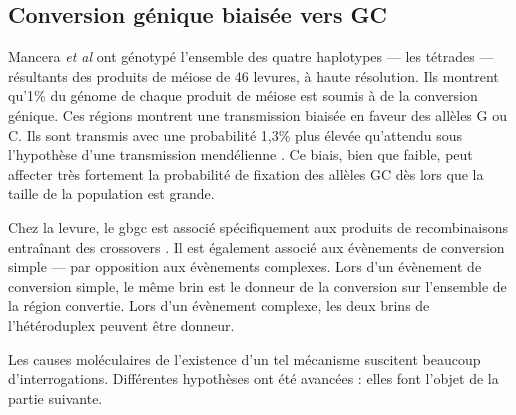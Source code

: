 \documentclass[11pt, oneside]{scrartcl}
\begin{document}
\subsection{Conversion génique biaisée vers GC}
\label{sec:orgheadline7}

Mancera \emph{et al} \cite{mancera_high-resolution_2008} ont génotypé l'ensemble des
quatre haplotypes --- les tétrades --- résultants des produits de méiose de 46
levures, à haute résolution. Ils montrent qu'1\% du génome de chaque produit de
méiose est soumis à de la conversion génique. Ces régions montrent une
transmission biaisée en faveur des allèles G ou C. Ils sont transmis avec une
probabilité 1,3\% plus élevée qu'attendu sous l'hypothèse d'une transmission
mendélienne \cite{mancera_high-resolution_2008}. Ce biais, bien que faible, peut
affecter très fortement la probabilité de fixation des allèles GC dès lors que
la taille de la population est grande\cite{nagylaki_evolution_1983}. 

Chez la levure, le \ac{gbgc} est associé spécifiquement aux produits de
recombinaisons entraînant des crossovers \cite{lesecque_gc-biased_2013}. Il est
également associé aux évènements de conversion simple --- par opposition aux
évènements complexes. Lors d'un évènement de conversion simple, le même brin est
le donneur de la conversion sur l'ensemble de la région convertie. Lors d'un
évènement complexe, les deux brins de l'hétéroduplex peuvent être donneur. 

\begin{transition}
  Les causes moléculaires de l'existence d'un tel mécanisme suscitent beaucoup
  d'interrogations. Différentes hypothèses ont été avancées : elles font l'objet
  de la partie suivante. 
\end{transition}
\end{document}
